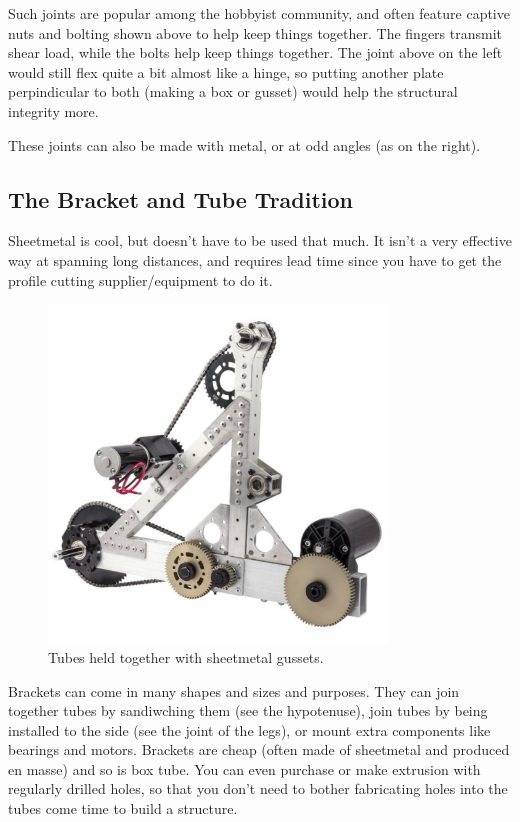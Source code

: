 \documentclass[10pt,letterpaper]{book}
\begin{document}
	Such joints are popular among the hobbyist community, and often feature captive nuts and bolting shown above to help keep things together. The fingers transmit shear load, while the bolts help keep things together. The joint above on the left would still flex quite a bit almost like a hinge, so putting another plate perpindicular to both (making a box or gusset) would help the structural integrity more.
	
	These joints can also be made with metal, or at odd angles (as on the right).
	
	\subsection{The Bracket and Tube Tradition}
	Sheetmetal is cool, but doesn't have to be used that much. It isn't a very effective way at spanning long distances, and requires lead time since you have to get the profile cutting supplier/equipment to do it.
	
	\begin{figure}[H]
		\includegraphics[width=0.8\textwidth]{imgs/tradition_gussetbox.jpeg}
		\caption{Tubes held together with sheetmetal gussets.}
	\end{figure}
	
	Brackets can come in many shapes and sizes and purposes. They can join together tubes by sandiwching them (see the hypotenuse), join tubes by being installed to the side (see the joint of the legs), or mount extra components like bearings and motors. Brackets are cheap (often made of sheetmetal and produced en masse) and so is box tube. You can even purchase or make extrusion with regularly drilled holes, so that you don't need to bother fabricating holes into the tubes come time to build a structure.
	
\end{document}
